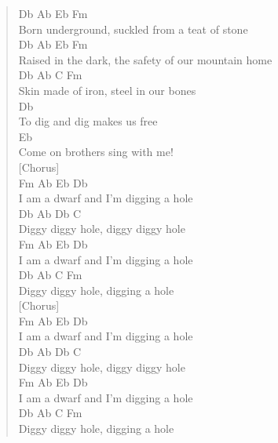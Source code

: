 \documentclass[11pt]{article}
\begin{document}
\begin{verse}
\vspace*{1em}
\vspace*{1em}
Db        Ab       Eb             Fm\\
Born underground, suckled from a teat of stone\\
Db              Ab        Eb           Fm\\
Raised in the dark, the safety of our mountain home\\
Db            Ab     C           Fm\\
Skin made of iron, steel in our bones\\
Db\\
To dig and dig makes us free\\
Eb\\
Come on brothers sing with me!\\
\vspace*{1em}
\vspace*{1em}
[Chorus]\\
Fm     Ab            Eb      Db\\
I am a dwarf and I'm digging a hole\\
\vspace*{1em}
Db         Ab   Db          C\\
Diggy diggy hole, diggy diggy hole\\
\vspace*{1em}
Fm     Ab           Eb       Db\\
I am a dwarf and I'm digging a hole\\
\vspace*{1em}
Db         Ab    C        Fm\\
Diggy diggy hole, digging a hole\\
\vspace*{1em}
[Chorus]\\
Fm     Ab            Eb      Db\\
I am a dwarf and I'm digging a hole\\
\vspace*{1em}
Db         Ab   Db          C\\
Diggy diggy hole, diggy diggy hole\\
\vspace*{1em}
Fm     Ab           Eb       Db\\
I am a dwarf and I'm digging a hole\\
\vspace*{1em}
Db         Ab    C        Fm\\
Diggy diggy hole, digging a hole\\
\end{verse}
\clearpage
\end{document}
